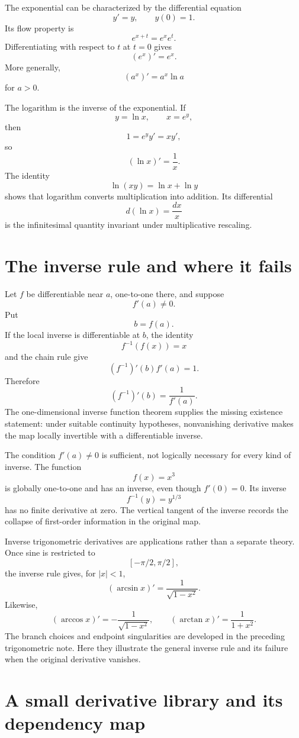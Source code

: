 The exponential can be characterized by the differential equation
\[
  y'=y,
  \qquad y(0)=1.
\]
Its flow property is
\[
  e^{x+t}=e^xe^t.
\]
Differentiating with respect to \(t\) at \(t=0\) gives
\[
  (e^x)'=e^x.
\]
More generally,
\[
  (a^x)'=a^x\ln a
\]
for \(a>0\).

The logarithm is the inverse of the exponential.  If
\[
  y=\ln x,
  \qquad x=e^y,
\]
then
\[
  1=e^yy'=xy',
\]
so
\[
  \boxed{(\ln x)'=\frac1x.}
\]
The identity
\[
  \ln(xy)=\ln x+\ln y
\]
shows that logarithm converts multiplication into addition.  Its differential
\[
  d(\ln x)=\frac{dx}{x}
\]
is the infinitesimal quantity invariant under multiplicative rescaling.

\section{The inverse rule and where it fails}

Let \(f\) be differentiable near \(a\), one-to-one there, and suppose
\[
  f'(a)\ne0.
\]
Put
\[
  b=f(a).
\]
If the local inverse is differentiable at \(b\), the identity
\[
  f^{-1}(f(x))=x
\]
and the chain rule give
\[
  (f^{-1})'(b)f'(a)=1.
\]
Therefore
\[
  \boxed{
  (f^{-1})'(b)=\frac1{f'(a)}.}
\]
The one-dimensional inverse function theorem supplies the missing existence statement: under suitable continuity hypotheses, nonvanishing derivative makes the map locally invertible with a differentiable inverse.

The condition \(f'(a)\ne0\) is sufficient, not logically necessary for every kind of inverse.  The function
\[
  f(x)=x^3
\]
is globally one-to-one and has an inverse, even though \(f'(0)=0\).  Its inverse
\[
  f^{-1}(y)=y^{1/3}
\]
has no finite derivative at zero.  The vertical tangent of the inverse records the collapse of first-order information in the original map.

Inverse trigonometric derivatives are applications rather than a separate theory.  Once sine is restricted to
\[
  [-\pi/2,\pi/2],
\]
the inverse rule gives, for \(|x|<1\),
\[
  (\arcsin x)'
  =\frac1{\sqrt{1-x^2}}.
\]
Likewise,
\[
  (\arccos x)'=-\frac1{\sqrt{1-x^2}},
  \qquad
  (\arctan x)'=\frac1{1+x^2}.
\]
The branch choices and endpoint singularities are developed in the preceding trigonometric note.  Here they illustrate the general inverse rule and its failure when the original derivative vanishes.

\section{A small derivative library and its dependency map}


